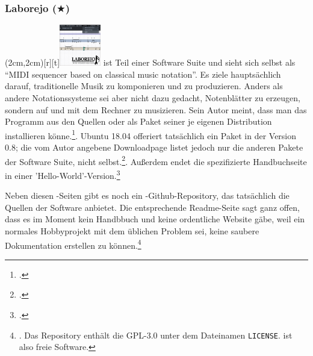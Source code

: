 %
%
%



\subsubsection{Laborejo ($\bigstar$)}

\parpic(2cm,2cm)[r][t]{\includegraphics[width=1.8cm]{logos/laborejo-300dpi.png}}
\label{Laborejo} ist Teil einer Software Suite und sieht sich
selbst als \enquote{MIDI sequencer based on classical music notation}. Es ziele
hauptsächlich darauf, traditionelle Musik zu komponieren und zu produzieren.
Anders als andere Notationssysteme sei  aber nicht dazu gedacht,
Notenblätter zu erzeugen, sondern auf und mit dem Rechner zu musizieren. Sein
Autor meint, dass man das Programm aus den Quellen oder als Paket seiner je
eigenen Distribution installieren könne.\footcite[vgl.][\nopage
wp]{Hilbricht2019a}. Ubuntu 18.04 offeriert tatsächlich ein Paket 
in der Version 0.8; die vom Autor angebene Downloadpage listet jedoch nur die
anderen Pakete der Software Suite, nicht 
selbst.\footcite[vgl.][\nopage wp]{Hilbricht2019b}. Außerdem endet die
spezifizierte Handbuchseite in einer
'Hello-World'-Version.\footcite[vgl.][\nopage wp]{Hilbricht2019c}

Neben diesen -Seiten gibt es noch ein
-Github-Repository, das tatsächlich die Quellen der Software
anbietet. Die entsprechende Readme-Seite sagt ganz offen, dass es im Moment kein
Handbbuch und keine ordentliche Website gäbe, weil  ein normales
Hobbyprojekt mit dem üblichen Problem sei, keine saubere Dokumentation erstellen
zu können.\footnote{\cite[vgl.][\nopage wp]{Laborejo2018a}. Das Repository
enthält die GPL-3.0 unter dem Dateinamen \texttt{LICENSE}.  ist
also freie Software.}

